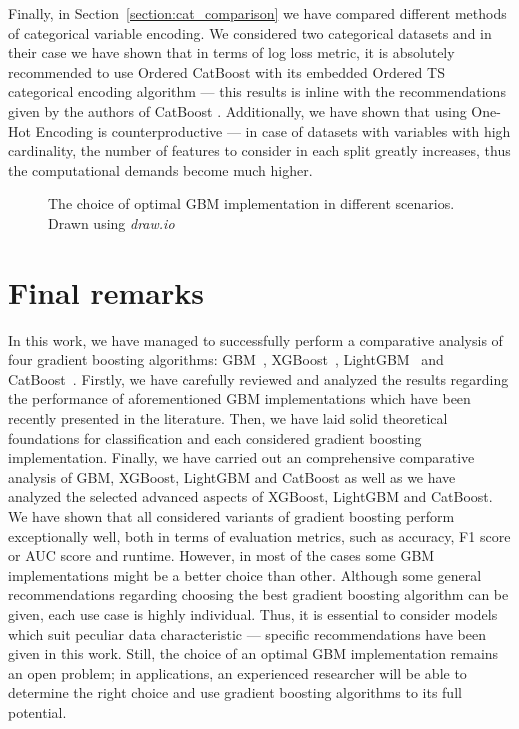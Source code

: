 \documentclass[magisterska, english]{pwr_wmat_praca_dyplomowa}
\theoremstyle{plain}
\numberwithin{theorem}{chapter}
\theoremstyle{definition}
\numberwithin{theorem}{chapter}
\begin{document}
Finally, in Section~\ref{section:cat_comparison} we have compared different methods of categorical variable encoding. We considered two categorical datasets and in their case we have shown that in terms of log loss metric, it is absolutely recommended to use Ordered CatBoost with its embedded Ordered TS categorical encoding algorithm --- this results is inline with the recommendations given by the authors of CatBoost \cite{catboost}. Additionally, we have shown that using One-Hot Encoding is counterproductive --- in case of datasets with variables with high cardinality, the number of features to consider in each split greatly increases, thus the computational demands become much higher.

\begin{sidewaysfigure}
	\centering
	\caption{The choice of optimal GBM implementation in different scenarios. Drawn using \emph{draw.io}}
	\label{fig:recommendations}
\end{sidewaysfigure}

\newpage
\section{Final remarks}
In this work, we have managed to successfully perform a comparative analysis of four gradient boosting algorithms: GBM~\cite{friedman_gbm}, XGBoost~\cite{xgboost}, LightGBM~\cite{lightgbm} and CatBoost~\cite{catboost}. Firstly, we have carefully reviewed and analyzed the results regarding the performance of aforementioned GBM implementations which have been recently presented in the literature. Then, we have laid solid theoretical foundations for classification and each considered gradient boosting implementation. Finally, we have carried out an comprehensive comparative analysis of GBM, XGBoost, LightGBM and CatBoost as well as we have analyzed the selected advanced aspects of XGBoost, LightGBM and CatBoost. We have shown that all considered variants of gradient boosting perform exceptionally well, both in terms of evaluation metrics, such as accuracy, F1 score or AUC score and runtime. However, in most of the cases some GBM implementations might be a better choice than other. Although some general recommendations regarding choosing the best gradient boosting algorithm can be given, each use case is highly individual. Thus, it is essential to consider models which suit peculiar data characteristic --- specific recommendations have been given in this work. Still, the choice of an optimal GBM implementation remains an open problem; in applications, an experienced researcher will be able to determine the right choice and use gradient boosting algorithms to its full potential.
\end{document}
